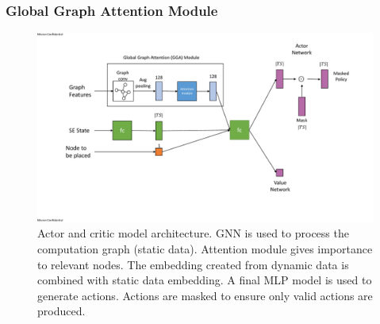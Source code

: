 \subsubsection{Global Graph Attention Module}

\begin{figure}[h]
  \centering
  \includegraphics[width=\textwidth]{fig/model_diagram.pdf}
  \caption{Actor and critic model architecture. GNN is used to process the computation graph (static data). 
  Attention module gives importance to relevant nodes. The embedding created from dynamic data is combined with static data embedding. 
  A final MLP model is used to generate actions. Actions are masked to ensure only valid actions are produced. }
  \label{fig:model}
\end{figure}

